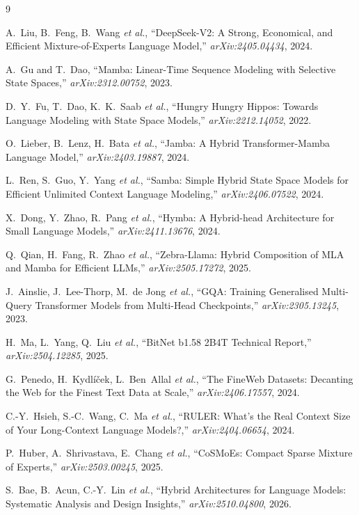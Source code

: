 \documentclass[conference]{IEEEtran}
\begin{document}
\begin{thebibliography}{9}

A.~Liu, B.~Feng, B.~Wang \emph{et al.},
``DeepSeek-V2: A Strong, Economical, and Efficient Mixture-of-Experts Language
Model,'' \emph{arXiv:2405.04434}, 2024.

A.~Gu and T.~Dao,
``Mamba: Linear-Time Sequence Modeling with Selective State Spaces,''
\emph{arXiv:2312.00752}, 2023.

D.~Y.~Fu, T.~Dao, K.~K.~Saab \emph{et al.},
``Hungry Hungry Hippos: Towards Language Modeling with State Space Models,''
\emph{arXiv:2212.14052}, 2022.

O.~Lieber, B.~Lenz, H.~Bata \emph{et al.},
``Jamba: A Hybrid Transformer-Mamba Language Model,''
\emph{arXiv:2403.19887}, 2024.

L.~Ren, S.~Guo, Y.~Yang \emph{et al.},
``Samba: Simple Hybrid State Space Models for Efficient Unlimited Context
Language Modeling,'' \emph{arXiv:2406.07522}, 2024.

X.~Dong, Y.~Zhao, R.~Pang \emph{et al.},
``Hymba: A Hybrid-head Architecture for Small Language Models,''
\emph{arXiv:2411.13676}, 2024.

Q.~Qian, H.~Fang, R.~Zhao \emph{et al.},
``Zebra-Llama: Hybrid Composition of MLA and Mamba for Efficient LLMs,''
\emph{arXiv:2505.17272}, 2025.

J.~Ainslie, J.~Lee-Thorp, M.~de Jong \emph{et al.},
``GQA: Training Generalised Multi-Query Transformer Models from Multi-Head
Checkpoints,'' \emph{arXiv:2305.13245}, 2023.

H.~Ma, L.~Yang, Q.~Liu \emph{et al.},
``BitNet b1.58 2B4T Technical Report,''
\emph{arXiv:2504.12285}, 2025.

G.~Penedo, H.~Kydl\'{i}\v{c}ek, L.~Ben~Allal \emph{et al.},
``The FineWeb Datasets: Decanting the Web for the Finest Text Data at Scale,''
\emph{arXiv:2406.17557}, 2024.

C.-Y.~Hsieh, S.-C.~Wang, C.~Ma \emph{et al.},
``RULER: What's the Real Context Size of Your Long-Context Language Models?,''
\emph{arXiv:2404.06654}, 2024.

P.~Huber, A.~Shrivastava, E.~Chang \emph{et al.},
``CoSMoEs: Compact Sparse Mixture of Experts,''
\emph{arXiv:2503.00245}, 2025.

S.~Bae, B.~Acun, C.-Y.~Lin \emph{et al.},
``Hybrid Architectures for Language Models: Systematic Analysis and Design
Insights,'' \emph{arXiv:2510.04800}, 2026.

\end{thebibliography}
\end{document}
